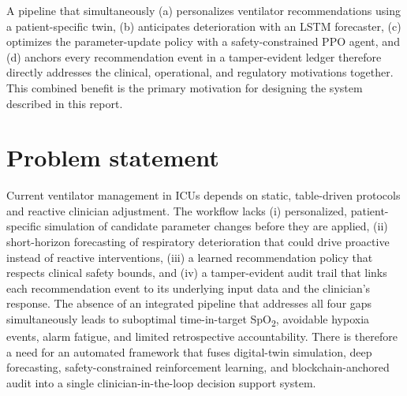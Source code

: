 \documentclass[12pt,a4paper,oneside]{report}
\begin{document}
A pipeline that simultaneously (a) personalizes ventilator recommendations using a patient-specific twin, (b) anticipates deterioration with an LSTM forecaster, (c) optimizes the parameter-update policy with a safety-constrained PPO agent, and (d) anchors every recommendation event in a tamper-evident ledger therefore directly addresses the clinical, operational, and regulatory motivations together. This combined benefit is the primary motivation for designing the system described in this report.

\section{Problem statement}
Current ventilator management in ICUs depends on static, table-driven protocols and reactive clinician adjustment. The workflow lacks (i) personalized, patient-specific simulation of candidate parameter changes before they are applied, (ii) short-horizon forecasting of respiratory deterioration that could drive proactive instead of reactive interventions, (iii) a learned recommendation policy that respects clinical safety bounds, and (iv) a tamper-evident audit trail that links each recommendation event to its underlying input data and the clinician's response. The absence of an integrated pipeline that addresses all four gaps simultaneously leads to suboptimal time-in-target SpO\textsubscript{2}, avoidable hypoxia events, alarm fatigue, and limited retrospective accountability. There is therefore a need for an automated framework that fuses digital-twin simulation, deep forecasting, safety-constrained reinforcement learning, and blockchain-anchored audit into a single clinician-in-the-loop decision support system.
\end{document}
